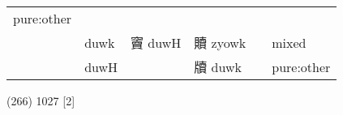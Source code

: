 \documentclass[14pt,a4paper]{scrartcl}
\begin{document}
\begin{longtable}[c]{@{}llllll@{}}
\begin{minipage}[t]{0.14\columnwidth}\raggedright\strut
pure:other
\strut\end{minipage}\tabularnewline
\begin{minipage}[t]{0.14\columnwidth}\raggedright\strut
𧸇
\strut\end{minipage} &
\begin{minipage}[t]{0.14\columnwidth}\raggedright\strut
duwk
\strut\end{minipage} &
\begin{minipage}[t]{0.14\columnwidth}\raggedright\strut
竇 duwH
\strut\end{minipage} &
\begin{minipage}[t]{0.14\columnwidth}\raggedright\strut
贖 zyowk
\strut\end{minipage} &
\begin{minipage}[t]{0.14\columnwidth}\raggedright\strut
\strut\end{minipage} &
\begin{minipage}[t]{0.14\columnwidth}\raggedright\strut
mixed
\strut\end{minipage}\tabularnewline
\begin{minipage}[t]{0.14\columnwidth}\raggedright\strut
𧷗
\strut\end{minipage} &
\begin{minipage}[t]{0.14\columnwidth}\raggedright\strut
duwH
\strut\end{minipage} &
\begin{minipage}[t]{0.14\columnwidth}\raggedright\strut
\strut\end{minipage} &
\begin{minipage}[t]{0.14\columnwidth}\raggedright\strut
牘 duwk
\strut\end{minipage} &
\begin{minipage}[t]{0.14\columnwidth}\raggedright\strut
\strut\end{minipage} &
\begin{minipage}[t]{0.14\columnwidth}\raggedright\strut
pure:other
\strut\end{minipage}\tabularnewline
\bottomrule
\end{longtable}

(266) 1027 {[}2{]}
\end{document}
